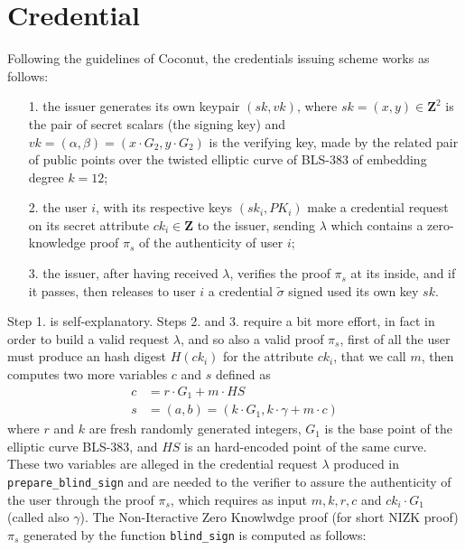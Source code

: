 \documentclass[twocolumn]{article}
\begin{document}
\lipsum[1]


\section{Credential}
\label{sec:credential}

Following the guidelines of Coconut, the credentials issuing scheme works as follows:
\begin{itemize}
\item [1.] the issuer generates its own keypair $(sk,vk)$, where $sk=(x,y)\in\mathbf{Z}^2$ is the pair of secret scalars (the signing key) and $vk=(\alpha, \beta)=(x\cdot G_2,y\cdot G_2)$ is the verifying key, made by the related pair of public points over the twisted elliptic curve of BLS-383 of embedding degree $k=12$; 
\item [2.] the user $i$, with its respective keys $(sk_i, PK_i)$ make a credential request on its secret attribute $ck_i\in\mathbf{Z}$ to the issuer, sending $\lambda$ which contains a zero-knowledge proof $\pi_s$ of the authenticity of user $i$; 
\item[3.] the issuer, after having received $\lambda$, verifies the proof $\pi_s$ at its inside, and if it passes, then releases to user $i$ a credential $\tilde{\sigma}$ signed used its own key $sk$.
\end{itemize}
Step 1. is self-explanatory. Steps 2. and 3. require a bit more effort, in fact in order to build a valid request $\lambda$, and so also a valid proof $\pi_s$, first of all the user must produce an hash digest $H(ck_i)$ for the attribute $ck_i$, that we call $m$, then computes two more variables $c$ and $s$ defined as
\begin{align*}
c &= r\cdot G_1 + m\cdot HS \\
s &= (a,b) = (k \cdot G_1, k\cdot \gamma + m\cdot c)
\end{align*}
where $r$ and $k$ are fresh randomly generated integers, $G_1$ is the base point of the elliptic curve BLS-383, and $HS$ is an hard-encoded point of the same curve. These two variables are alleged in the credential request $\lambda$ produced in \verb!prepare_blind_sign! and are needed to the verifier to assure the authenticity of the user through the proof $\pi_s$, which requires as input $m, k, r, c$ and $ck_i\cdot G_1$ (called also $\gamma$). The Non-Iteractive Zero Knowlwdge proof (for short NIZK proof) $\pi_s$ generated by the function \verb!blind_sign! is computed as follows:
\end{document}
